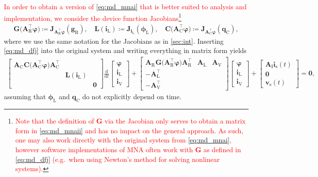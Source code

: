 \documentclass[AMA,STIX1COL]{WileyNJD-v2}
\newcommand{\mb}[1]{\mathbf{#1}}
\newcommand{\mr}[1]{\mathrm{#1}}
\newcommand{\T}{{\!\top}}
\newcommand{\ddt}{\frac{\mathrm{d}}{\mathrm{d}t}}
\newcommand{\A}[1]{\mb{A}_\mr{#1}}
\newcommand{\AT}[1]{\mb{A}_\mr{#1}^{\T}}
\newcommand{\qC}{\mb{q}_\mr{C}}
\newcommand{\gR}{\mb{g}_\mr{R}}
\newcommand{\phiL}{\boldsymbol{\phi}_\mr{L}}
\newcommand{\vphi}{\boldsymbol{\varphi}}
\renewcommand{\i}[1]{\mb{i}_\mr{#1}}
\renewcommand{\v}[1]{\mb{v}_\mr{#1}}
\begin{document}
\textcolor{red}{In order to obtain a version of \eqref{eq:md_mnai} that is better suited to analysis and implementation, we consider the device function Jacobians\footnote{\textcolor{red}{Note that the definition of $\mb{G}$ via the Jacobian only serves to obtain a matrix form in \eqref{eq:md_mnaii} and has no impact on the general approach. As such, one may also work directly with the original system from \eqref{eq:md_mnai}, however software implementations of MNA often work with $\mb{G}$ as defined in \eqref{eq:md_dfj} (e.g.~when using Newton's method for solving nonlinear systems).}}}
\begin{align}
    \mb{G} \big( \AT{R} \vphi \big) \coloneqq \mb{J}_{\AT{R} \vphi}(\gR), \quad \mb{L}(\i{L}) \coloneqq \mb{J}_{\i{L}}(\phiL), \quad \mb{C} \big( \AT{C} \vphi \big) \coloneqq \mb{J}_{\AT{C} \vphi}(\qC), \label{eq:md_dfj}
\end{align}
where we use the same notation for the Jacobians as in \autoref{sec:int}. Inserting \eqref{eq:md_dfj} into the original system and writing everything in matrix form yields
\begin{align}
    \begin{bmatrix}
        \A{C}^{\phantom{\T}} \mb{C} \big( \AT{C} \vphi \big) \AT{C} & &\\
        & \mb{L}(\i{L}) &\\
        & & \mb{0}
    \end{bmatrix} \ddt \begin{bmatrix}
        \vphi\\
        \i{L}\\
        \i{V}
    \end{bmatrix} + \begin{bmatrix}
        \A{R}^{\phantom{\T}} \mb{G} \big( \AT{R} \vphi \big) \AT{R} & \A{L} & \A{V}\\
        -\AT{L} & &\\
        -\AT{V} & &
    \end{bmatrix} \begin{bmatrix}
        \vphi\\
        \i{L}\\
        \i{V}
    \end{bmatrix} + \begin{bmatrix}
        \A{I} \i{s}(t)\\
        \mb{0}\\
        \v{s}(t)
    \end{bmatrix} = \mb{0}, \label{eq:md_mnaii}
\end{align}
assuming that $\phiL$ and $\qC$ do not explicitly depend on time.
\end{document}
